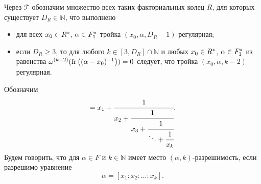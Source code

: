 \documentclass[_00_dissertation.tex]{subfiles}
\begin{document}
\begin{definition}
    Через $\mathcal{T}$ обозначим множество всех таких факториальных колец $R$, для которых существует $D_R \in \mathbb{N}$, что выполнено
    \begin{itemize}
        \item для всех $x_0 \in R^{*}$, $\alpha \in F_1^{*}$ тройка $(x_0, \alpha, D_R - 1)$ регулярная;

        \item если $D_R \ge 3$, то для любого $k \in [3, D_R] \cap \mathbb{N}$ и любых $x_0 \in R^{*}$, $\alpha \in F_1^{*}$ из равенства $\omega^{(k-2)}(\textrm{fr}\left((\alpha - x_0)^{-1}\right)) = 0$ следует, что тройка $(x_0, \alpha, k-2)$ регулярная.
    \end{itemize}
\end{definition}

\begin{definition}
    Обозначим
    \begin{equation*}
        [x_1: x_2: \dots: x_k] = x_{1} + \cfrac{1}{
            x_{2} + \cfrac{1}{
                x_{3} + \cfrac{1}{
                    \ddots + \cfrac{1}{
                        x_{k}
                    }
                }
            }
        }.
    \end{equation*}
    Будем говорить, что для $\alpha \in F$ и $k \in \mathbb{N}$ имеет место $(\alpha, k)$-разрешимость, если разрешимо уравнение
    \begin{equation*}
        \alpha = [x_1: x_2: \dots: x_k].
    \end{equation*}
\end{definition}
\end{document}
